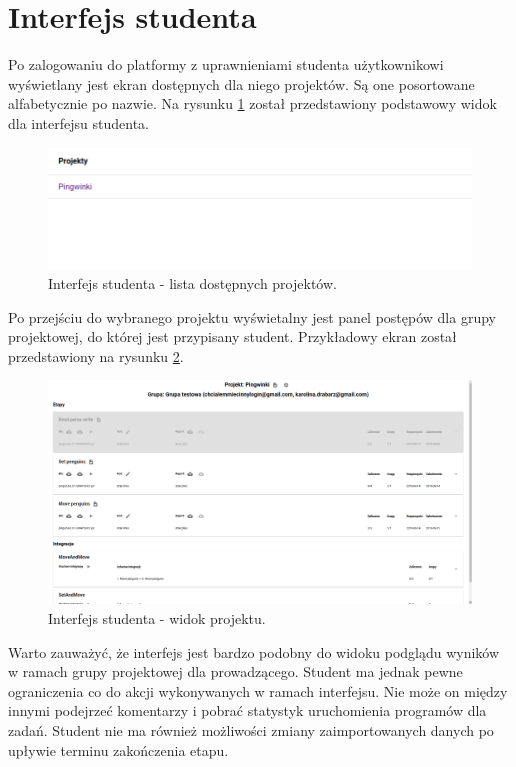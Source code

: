\section{Interfejs studenta}

Po zalogowaniu do platformy z uprawnieniami studenta użytkownikowi wyświetlany jest ekran dostępnych dla niego projektów.
Są one posortowane alfabetycznie po nazwie.
Na rysunku \ref{fig:student_projects} został przedstawiony podstawowy widok dla interfejsu studenta.

\begin{figure}[h]
    \centering
    \includegraphics[width = 13cm]{chapter04/student_projects.png}
    \caption{Interfejs studenta - lista dostępnych projektów.}
    \label{fig:student_projects}
\end{figure}

Po przejściu do wybranego projektu wyświetalny jest panel postępów dla grupy projektowej, do której jest przypisany student.
Przykładowy ekran został przedstawiony na rysunku \ref{fig:student_project_board}.

\begin{figure}[h]
    \centering
    \includegraphics[width = 13cm]{chapter04/student_project_board.png}
    \caption{Interfejs studenta - widok projektu.}
    \label{fig:student_project_board}
\end{figure}

Warto zauważyć, że interfejs jest bardzo podobny do widoku podglądu wyników w ramach grupy projektowej dla prowadzącego.
Student ma jednak pewne ograniczenia co do akcji wykonywanych w ramach interfejsu.
Nie może on między innymi podejrzeć komentarzy i pobrać statystyk uruchomienia programów dla zadań.
Student nie ma również możliwości zmiany zaimportowanych danych po upływie terminu zakończenia etapu.

